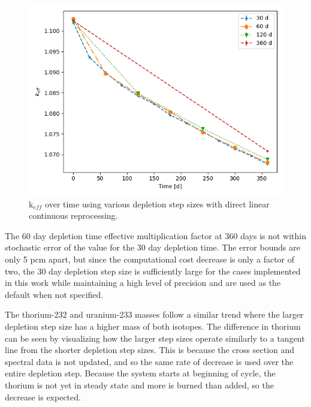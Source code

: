 \begin{figure}[H]
  \centering
  \includegraphics[scale=0.7]{images/DL_NSTEP_keff-large.png}
  \caption{k$_{eff}$ over time using various depletion step sizes with direct linear continuous reprocessing.}
   \label{fig:DL-cont-k-2}
\end{figure}

The 60 day depletion time effective multiplication factor at 360 days is not within stochastic error of the value for the 30 day depletion time. The error bounds are only 5 pcm apart, but since the computational cost decrease is only a factor of two, the 30 day depletion step size is sufficiently large for the cases implemented in this work while maintaining a high level of precision and are used as the default when not specified.

The thorium-232 and uranium-233 masses follow a similar trend where the larger depletion step size has a higher mass of both isotopes. The difference in thorium can be seen by visualizing how the larger step sizes operate similarly to a tangent line from the shorter depletion step sizes. This is because the cross section and spectral data is not updated, and so the same rate of decrease is used over the entire depletion step. Because the system starts at beginning of cycle, the thorium is not yet in steady state and more is burned than added, so the decrease is expected. 

